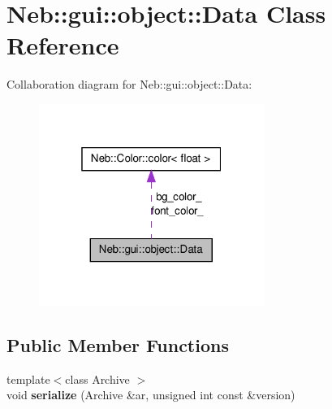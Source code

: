 \hypertarget{classNeb_1_1gui_1_1object_1_1Data}{\section{\-Neb\-:\-:gui\-:\-:object\-:\-:\-Data \-Class \-Reference}
\label{classNeb_1_1gui_1_1object_1_1Data}
}


\-Collaboration diagram for \-Neb\-:\-:gui\-:\-:object\-:\-:\-Data\-:\nopagebreak
\begin{figure}[H]
\begin{center}
\leavevmode
\includegraphics[width=208pt]{classNeb_1_1gui_1_1object_1_1Data__coll__graph}
\end{center}
\end{figure}
\subsection*{\-Public \-Member \-Functions}
\begin{DoxyCompactItemize}
\item 
\hypertarget{classNeb_1_1gui_1_1object_1_1Data_acb81238a3d1971c883a1136c4ac53bc0}{{\footnotesize template$<$class Archive $>$ }\\void {\bfseries serialize} (\-Archive \&ar, unsigned int const \&version)}\label{classNeb_1_1gui_1_1object_1_1Data_acb81238a3d1971c883a1136c4ac53bc0}

\end{DoxyCompactItemize}
